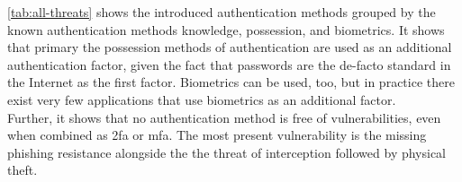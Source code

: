 \autoref{tab:all-threats} shows the introduced authentication methods grouped by the known authentication methods knowledge, possession, and biometrics. It shows that primary the possession methods of authentication are used as an additional authentication factor, given the fact that passwords are the de-facto standard in the Internet as the first factor. Biometrics can be used, too, but in practice there exist very few applications that use biometrics as an additional factor.\\
Further, it shows that no authentication method is free of vulnerabilities, even when combined as \gls{2fa} or \gls{mfa}. The most present vulnerability is the missing phishing resistance alongside the the threat of interception followed by physical theft.